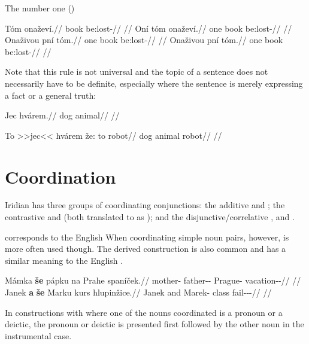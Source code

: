 The number one ()

\pex
\a
\begingl
\gla Tóm onaževí.//
\glb book be:lost-//
\glft {}//
\endgl
\a
\begingl
\gla Oní tóm onaževí.//
\glb one book be:lost-//
\glft {}//
\endgl
\a
\begingl
\gla Onaživou pní tóm.//
\glb one book be:lost-//
\glft {}//
\endgl
\a
\begingl
\gla Onaživou pní tóm.//
\glb one book be:lost-//
\glft {}//
\endgl
\xe


Note that this rule is not universal and the topic of a sentence does not necessarily have to be definite, especially where the sentence is merely expressing a fact or a general truth:

\pex
\begingl
\gla Jec hvárem.//
\glb dog animal//
\glft {}//
\endgl
\xe



\pex
\begingl
\gla To >>jec<< hvárem že: to robot//
\glb \Dem{} dog animal  \Dem{} robot//
\glft {}//
\endgl
\xe

\section{Coordination} 

Iridian has three groups of coordinating conjunctions: the additive  and ;
the contrastive  and  (both translated to  as ); and
the disjunctive/correlative ,  and .

 corresponds to the English  When coordinating simple noun pairs, however,  is more often used though. The derived construction  is also common and has a similar meaning to the English .

\pex
\begingl
    \gla Mámka \textbf{še} pápku na Prahe spaníček.//
    \glb mother-\Dim{} \Com{} father-\Dim{}-\Ins{} \Loc{} Prague-\Pat{} vacation-\Av{}-\Pf{}//
    \glft {}//
\endgl
\xe
\pex
\begingl
    \gla Janek \textbf{a} \textbf{še} Marku kurs hlupinžice.//
    \glb Janek and \Com{} Marek-\Ins{} class fail-\Av{}-\Pf{}-\Quot{}//
    \glft {}//
\endgl
\xe

In constructions with  where one of the nouns coordinated is a pronoun or a deictic, the pronoun or deictic is presented first followed by the other noun in the instrumental case.

